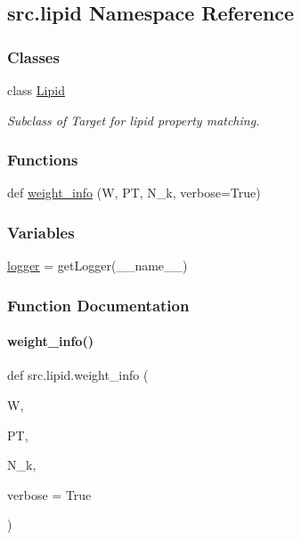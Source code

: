 \hypertarget{namespacesrc_1_1lipid}{}\subsection{src.\+lipid Namespace Reference}
\label{namespacesrc_1_1lipid}
\subsubsection*{Classes}
\begin{DoxyCompactItemize}
\item 
class \hyperlink{classsrc_1_1lipid_1_1Lipid}{Lipid}
\begin{DoxyCompactList}\small\item\em Subclass of Target for lipid property matching. \end{DoxyCompactList}\end{DoxyCompactItemize}
\subsubsection*{Functions}
\begin{DoxyCompactItemize}
\item 
def \hyperlink{namespacesrc_1_1lipid_a0d0fab6218612706aecbd80c47032a88}{weight\+\_\+info} (W, PT, N\+\_\+k, verbose=True)
\end{DoxyCompactItemize}
\subsubsection*{Variables}
\begin{DoxyCompactItemize}
\item 
\hyperlink{namespacesrc_1_1lipid_aae9ad8fd26bbf42838d626ced6295a26}{logger} = get\+Logger(\+\_\+\+\_\+name\+\_\+\+\_\+)
\end{DoxyCompactItemize}


\subsubsection{Function Documentation}
\mbox{\label{namespacesrc_1_1lipid_a0d0fab6218612706aecbd80c47032a88}} 
\paragraph{\texorpdfstring{weight\+\_\+info()}{weight\_info()}}
{\footnotesize\ttfamily def src.\+lipid.\+weight\+\_\+info (\begin{DoxyParamCaption}\item[{}]{W,  }\item[{}]{PT,  }\item[{}]{N\+\_\+k,  }\item[{}]{verbose = {\ttfamily True} }\end{DoxyParamCaption})}



